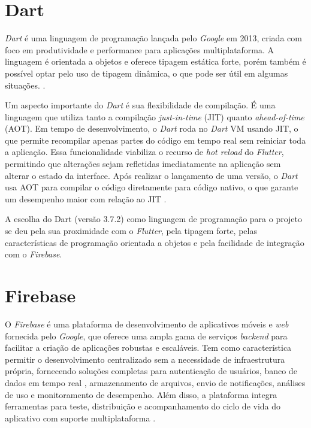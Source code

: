 \section{Dart}

\textit{Dart} é uma linguagem de programação lançada pelo \textit{Google} em 2013, criada com foco em produtividade e 
performance para aplicações multiplataforma. A linguagem é orientada a objetos e oferece tipagem 
estática forte, porém também é possível optar pelo uso de tipagem dinâmica, 
o que pode ser útil em algumas situações. \cite{dartDocs2025}.

Um aspecto importante do \textit{Dart} é sua flexibilidade de compilação. 
É uma linguagem que utiliza tanto a compilação \textit{just-in-time} 
(JIT) quanto \textit{ahead-of-time} (AOT). 
Em tempo de desenvolvimento, o \textit{Dart} roda no \textit{Dart} VM 
usando JIT, o que permite recompilar apenas partes 
do código em tempo real sem reiniciar toda a aplicação. Essa funcionalidade 
viabiliza o recurso de \textit{hot reload} do \textit{Flutter}, permitindo 
que alterações sejam refletidas imediatamente na aplicação sem alterar o 
estado da interface.
Após realizar o lançamento de uma versão, o \textit{Dart} usa AOT para compilar o código diretamente 
para código nativo, o que garante um desempenho maior com relação ao JIT \cite{dartDocs2025}.

A escolha do Dart (versão 3.7.2) como linguagem de programação para o projeto se deu pela sua
proximidade com o \textit{Flutter}, pela tipagem forte, pelas características de 
programação orientada a objetos e pela facilidade de integração com o \textit{Firebase}.

\section{Firebase}

O \textit{Firebase} é uma plataforma de desenvolvimento de aplicativos móveis e \textit{web} 
fornecida pelo \textit{Google}, que oferece uma ampla gama de serviços \textit{backend} para 
facilitar a criação de aplicações robustas e escaláveis. Tem como característica 
permitir o desenvolvimento centralizado sem a necessidade de infraestrutura própria, 
fornecendo soluções completas para autenticação de usuários, banco de dados em tempo real
, armazenamento de arquivos, envio de notificações, análises de uso e monitoramento de 
desempenho. Além disso, a plataforma integra ferramentas para teste, distribuição 
e acompanhamento do ciclo de vida do aplicativo com suporte multiplataforma \cite{firebase2025}.

